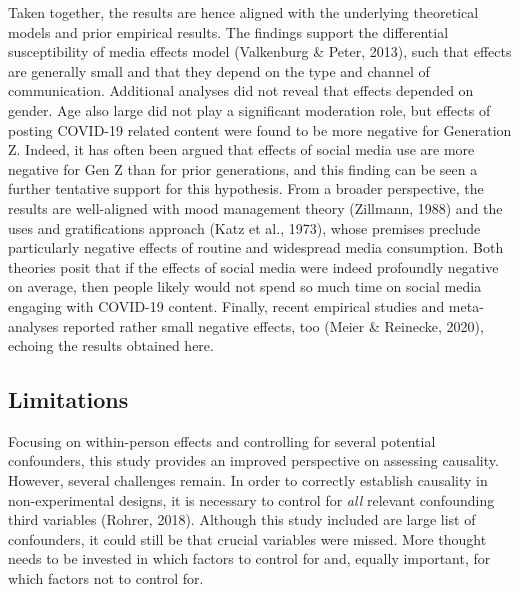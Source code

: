 \documentclass[
  man,mask,floatsintext]{apa7}
\begin{document}
Taken together, the results are hence aligned with the underlying theoretical models and prior empirical results.
The findings support the differential susceptibility of media effects model (Valkenburg \& Peter, 2013), such that effects are generally small and that they depend on the type and channel of communication.
Additional analyses did not reveal that effects depended on gender.
Age also large did not play a significant moderation role, but effects of posting COVID-19 related content were found to be more negative for Generation Z.
Indeed, it has often been argued that effects of social media use are more negative for Gen Z than for prior generations, and this finding can be seen a further tentative support for this hypothesis.
From a broader perspective, the results are well-aligned with mood management theory (Zillmann, 1988) and the uses and gratifications approach (Katz et al., 1973), whose premises preclude particularly negative effects of routine and widespread media consumption.
Both theories posit that if the effects of social media were indeed profoundly negative on average, then people likely would not spend so much time on social media engaging with COVID-19 content.
Finally, recent empirical studies and meta-analyses reported rather small negative effects, too (Meier \& Reinecke, 2020),
echoing the results obtained here.

\hypertarget{limitations}{%
\subsection{Limitations}\label{limitations}}

Focusing on within-person effects and controlling for several potential confounders, this study provides an improved perspective on assessing causality.
However, several challenges remain.
In order to correctly establish causality in non-experimental designs, it is necessary to control for \emph{all} relevant confounding third variables (Rohrer, 2018).
Although this study included are large list of confounders, it could still be that crucial variables were missed.
More thought needs to be invested in which factors to control for and, equally important, for which factors not to control for.
\end{document}
